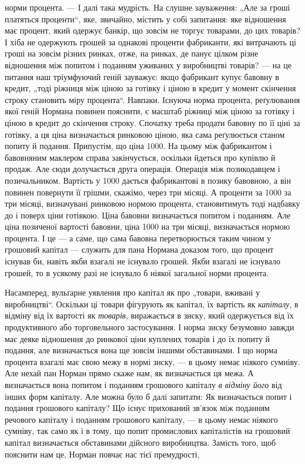 \parcont{}  %
норми процента. — І далі така мудрість. На слушне зауваження:
„Але за гроші платяться проценти“, яке, звичайно, містить у собі
запитання: яке відношення має процент, який одержує банкір,
що зовсім не торгує товарами, до цих товарів? І хіба не одержують грошей за однакові проценти
фабриканти, які витрачають
ці гроші на зовсім різних ринках, отже, на ринках, де панує
цілком різне відношення між попитом і поданням уживаних у виробництві товарів? — на це питання наш
тріумфуючий геній зауважує: якщо фабрикант купує бавовну в кредит, „тоді ріжниця між ціною за
готівку і ціною в кредит у момент скінчення строку становить міру процента“. Навпаки. Існуюча норма
процента, реґулювання якої геній Нормана повинен пояснити, є масштаб ріжниці
між ціною за готівку і ціною в кредит до скінчення строку. Спочатку треба продати бавовну по її ціні
за готівку, а ця ціна визначається ринковою ціною, яка сама реґулюється станом попиту
й подання. Припустім, що ціна \deq{} 1000. На цьому
між фабрикантом і бавовняним маклером справа закінчується,
оскільки йдеться про купівлю й продаж. Але сюди долучається
друга операція. Операція між позикодавцем і позичальником. Вартість у 1000 дається
фабрикантові в позику бавовною, а він повинен повернути її грішми, скажімо, через три місяці. А
проценти за 1000 за три місяці, визначувані
ринковою нормою процента, становитимуть тоді надбавку до і поверх ціни готівкою. Ціна бавовни
визначається попитом і поданням.
Але ціна позиченої вартості бавовни, ціна 1000 на
три місяці, визначається нормою процента. І це — а саме, що сама
бавовна перетворюється таким чином у грошовий капітал — служить для пана Нормана доказом того, що
процент існував би, навіть
якби взагалі не існувало грошей. Якби взагалі не існувало грошей,
то в усякому разі не існувало б ніякої загальної норми процента.

Насамперед, вульґарне уявлення про капітал як про „товари,
вживані у виробництві“. Оскільки ці товари фігурують як капітал, їх вартість як \emph{капіталу}, в відміну
від їх вартості як \emph{товарів}, виражається в зиску, який одержується від їх продуктивного або
торговельного застосування. І норма зиску безумовно
завжди має деяке відношення до ринкової ціни куплених товарів
і до їх попиту й подання, але визначається вона ще зовсім іншими
обставинами. І що норма процента взагалі має свою межу в нормі
зиску, — в цьому немає ніякого сумніву. Але нехай пан Норман
прямо скаже нам, як визначається ця межа. А визначається
вона попитом і поданням грошового капіталу \emph{в відміну його} від
інших форм капіталу. Але можна було б далі запитати: Як визначається попит і подання грошового
капіталу? Що існує прихований зв’язок між поданням речового капіталу і поданням грошового капіталу,
— в цьому немає ніякого сумніву, так само як
і в тому, що попит промислових капіталістів на грошовий капітал визначається обставинами дійсного
виробництва. Замість
того, щоб пояснити нам це, Норман повчає нас тієї премудрості,
\parbreak{}  %
